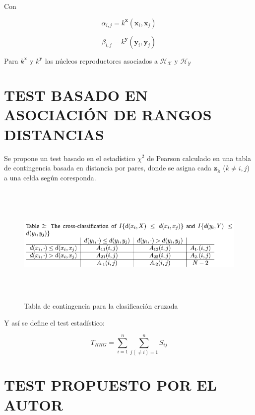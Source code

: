 \documentclass[]{book}
\begin{document}
Con

\[\alpha_{i,j} = k^{ \mathcal{\mathbf{x}}} (\mathcal{\mathbf{x}}_i, \mathcal{\mathbf{x}}_j)\]

\[\beta_{i,j} = k^{ \mathcal{\mathbf{y}}} (\mathcal{\mathbf{y}}_i, \mathcal{\mathbf{y}}_j)\]

Para \(k^{ \mathcal{\mathbf{x}}}\) y \(k^{ \mathcal{\mathbf{y}}}\) las
núcleos reproductores asociados a \(\mathcal{H_X}\) y \(\mathcal{H_Y}\)

\chapter{TEST BASADO EN ASOCIACIÓN DE RANGOS
DISTANCIAS}\label{test-basado-en-asociacion-de-rangos-distancias}

Se propone un test basado en el estadístico \(\chi^2\) de Pearson
calculado en una tabla de contingencia basada en distancia por pares,
donde se asigna cada \(\mathbf{z_k}\) (\(k \neq i, j\)) a una celda
según coresponda.

\begin{figure}
  
  {\centering \includegraphics[width=450,height=220]{test5} 
  
  }
  
  \caption{Tabla de contingencia para la clasificación cruzada}\label{fig:unnamed-chunk-8}
  \end{figure}

Y así se define el test estadístico:

\[ T_{HHG} = \displaystyle  \sum_{i=1}^n  \sum_{j (\neq i) =1}^n S_{ij} \]

\chapter{TEST PROPUESTO POR EL AUTOR}\label{test-propuesto-por-el-autor}
\end{document}
